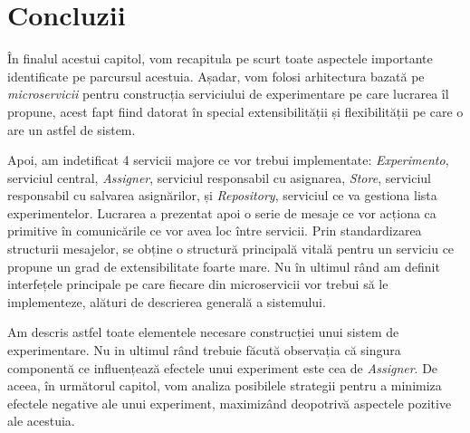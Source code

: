 \section{Concluzii}

În finalul acestui capitol, vom recapitula pe scurt toate aspectele importante identificate pe parcursul acestuia. Așadar, vom folosi arhitectura bazată pe \textit{microservicii} pentru construcția serviciului de experimentare pe care lucrarea îl propune, acest fapt fiind datorat în special extensibilității și flexibilității pe care o are un astfel de sistem.

Apoi, am indetificat 4 servicii majore ce vor trebui implementate: \textit{Experimento}, serviciul central, \textit{Assigner}, serviciul responsabil cu asignarea, \textit{Store}, serviciul responsabil cu salvarea asignărilor, și \textit{Repository}, serviciul ce va gestiona lista experimentelor. Lucrarea a prezentat apoi o serie de mesaje ce vor acționa ca primitive în comunicările ce vor avea loc între servicii. Prin standardizarea structurii mesajelor, se obține o structură principală vitală pentru un serviciu ce propune un grad de extensibilitate foarte mare. Nu în ultimul rând am definit interfețele principale pe care fiecare din microservicii vor trebui să le implementeze, alături de descrierea generală a sistemului. 

Am descris astfel toate elementele necesare construcției unui sistem de experimentare. Nu in ultimul rând trebuie făcută observația că singura componentă ce influențează efectele unui experiment este cea de \textit{Assigner}. De aceea, în următorul capitol, vom analiza posibilele strategii pentru a minimiza efectele negative ale unui experiment, maximizând deopotrivă aspectele pozitive ale acestuia.